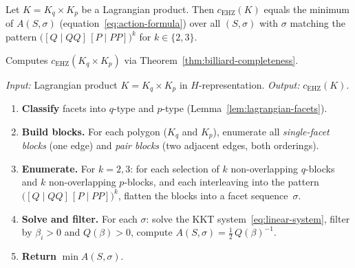 %
%


\begin{theorem}%
\label{thm:billiard-completeness}
Let $K = K_q \times K_p$ be a Lagrangian product.
Then $c_{\mathrm{EHZ}}(K)$ equals the minimum of $A(S, \sigma)$
(equation~\eqref{eq:action-formula})
over all $(S, \sigma)$ with $\sigma$ matching the pattern
$\bigl([Q \mid QQ]\,[P \mid PP]\bigr)^k$
for $k \in \{2, 3\}$.
\end{theorem}


\begin{algorithm}\label{alg:billiard}
Computes $c_{\mathrm{EHZ}}(K_q \times K_p)$
via Theorem~\ref{thm:billiard-completeness}.

\emph{Input:} Lagrangian product $K = K_q \times K_p$ in
$H$-representation.
\quad
\emph{Output:} $c_{\mathrm{EHZ}}(K)$.

\begin{enumerate}
\item \textbf{Classify} facets into $q$-type and $p$-type
  (Lemma~\ref{lem:lagrangian-facets}).
\item \textbf{Build blocks.}
  For each polygon ($K_q$ and $K_p$), enumerate all
  \emph{single-facet blocks} (one edge) and
  \emph{pair blocks} (two adjacent edges, both orderings).
\item \textbf{Enumerate.}
  For $k = 2, 3$: for each selection of $k$ non-overlapping
  $q$-blocks and $k$ non-overlapping $p$-blocks, and each
  interleaving into the pattern
  $\bigl([Q \mid QQ]\,[P \mid PP]\bigr)^k$,
  flatten the blocks into a facet sequence~$\sigma$.
\item \textbf{Solve and filter.}
  For each $\sigma$: solve the KKT system~\eqref{eq:linear-system},
  filter by $\beta_i > 0$ and $Q(\beta) > 0$, compute
  $A(S, \sigma) = \tfrac{1}{2}\, Q(\beta)^{-1}$.
\item \textbf{Return} $\min A(S, \sigma)$.
\end{enumerate}
\end{algorithm}
